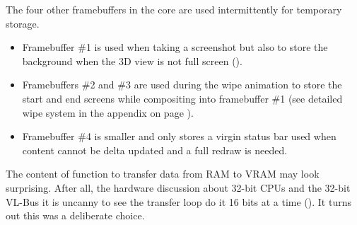 \par
The four other framebuffers in the core are used intermittently for temporary storage.
\begin{itemize} 
\item Framebuffer \#1 is used when taking a screenshot but also to store the background when the 3D view is not full screen ().

\item Framebuffers \#2 and \#3 are used during the wipe animation to store the start and end screens while compositing into framebuffer \#1 (see detailed wipe system in the appendix on page \pageref{label_melt}). 
\item Framebuffer \#4 is smaller and only stores a virgin status bar used when content cannot be delta updated and a full redraw is needed. 
\end{itemize}
\par



The content of function  to transfer data from RAM to VRAM may look surprising. After all, the hardware discussion about 32-bit CPUs and the 32-bit VL-Bus it is uncanny to see the transfer loop do it 16 bits at a time (). It turns out this was a deliberate choice.\\
\par
{}\\
\par
{}
\par
